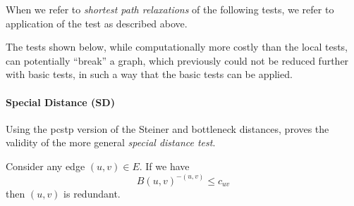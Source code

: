 When we refer to
\textit{shortest path relaxations} of the following tests, we refer to application of the test
 as described above.

 The tests shown below, while computationally more costly than the local tests, can potentially
 ``break'' a graph, which previously could not be reduced further with basic tests, in such a
 way that the basic tests can be applied.
 \paragraph{Special Distance (SD)}\label{sec:red:test:sd}
 Using the \gls{pcstp} version of the Steiner and bottleneck distances,
 \citet{uchoa2006reduction} proves
  the validity of the more general \textit{special distance test}.
 \begin{theorem}
 Consider any edge $(u,v) \in E$. If we have
 \[{B(u,v)}^{-(u,v)} \leq c_{uv}\]
 then $(u,v)$ is redundant.
\end{theorem}
